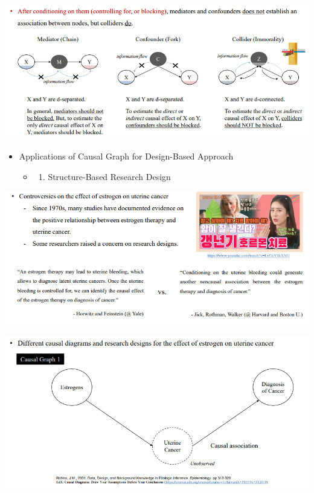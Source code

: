 \documentclass[
]{book}
\providecommand{\tightlist}{%
  \setlength{\itemsep}{0pt}\setlength{\parskip}{0pt}}
\theoremstyle{definition}
\theoremstyle{definition}
\theoremstyle{definition}
\theoremstyle{definition}
\theoremstyle{remark}
\begin{document}
\includegraphics{figures/39.png}

\begin{itemize}
\tightlist
\item
  Applications of Causal Graph for Design-Based Approach

  \begin{itemize}
  \item
    \begin{enumerate}
    \def\labelenumi{(\arabic{enumi})}
    \tightlist
    \item
      Structure-Based Research Design
    \end{enumerate}
  \end{itemize}
\end{itemize}

\includegraphics{figures/40.png}

\includegraphics{figures/41.png}
\end{document}
